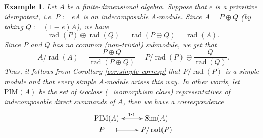 \documentclass[11pt,a4paper]{article}
\numberwithin{equation}{section}
\theoremstyle{all}
\newtheorem{example}[theorem]{Example}
\theoremstyle{remark}
\newcommand{\rad}{\operatorname{rad}\nolimits}
\begin{document}
\begin{example}\label{eg:P/radP simple}
Let $A$ be a finite-dimensional algebra.
Suppose that $e$ is a primitive idempotent, i.e. $P:=eA$ is an indecomposable $A$-module.
Since $A=P\oplus Q$ (by taking $Q:=(1-e) A$), we have
\[ \rad(P)\oplus \rad(Q) = \rad(P\oplus Q) = \rad(A). \]
Since $P$ and $Q$ has no common (non-trivial) submodule, we get that
\[ A/\rad(A) = \frac{P\oplus Q}{\rad(P\oplus Q)} = P/\rad (P) \oplus \frac{Q}{\rad(Q)}. \]
Thus, it follows from Corollary \ref{cor:simple corresp} that $P/\rad (P)$ is a simple module and that every simple $A$-module arises this way.
In other words, let $\mathrm{PIM}(A)$ be the set of isoclass (=isomorphism class) representatives of indecomposable direct summands of $A$, then we have a correspondence
\begin{align}\label{eq:simple-proj corresp.}
\xymatrix@R=0pt{
\mathrm{PIM}(A)\ar@{<->}[r]^{1:1} & \mathrm{Sim}(A)\\
P\phantom{abc} \ar@{|->}[r] & {P/\rad(P)}
}
\end{align}
\end{example}
\end{document}
